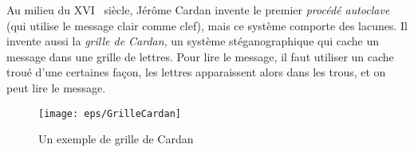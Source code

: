 Au milieu du XVI\ieme~ siècle, Jérôme Cardan invente le premier
\emph{procédé autoclave} (qui utilise le message clair comme clef),
mais ce système comporte des lacunes. Il invente aussi la \emph{grille
  de Cardan}, un système stéganographique qui cache un message dans
une grille de lettres. Pour lire le message, il faut utiliser un cache
troué d'une certaines façon, les lettres apparaissent alors dans les
trous, et on peut lire le message. \\

\begin{figure}[h]
  \begin{center}
    \texttt{[image: eps/GrilleCardan]}
  \end{center}
  \caption{Un exemple de grille de Cardan}
  \label{fig:GrilleCardan}
\end{figure}





